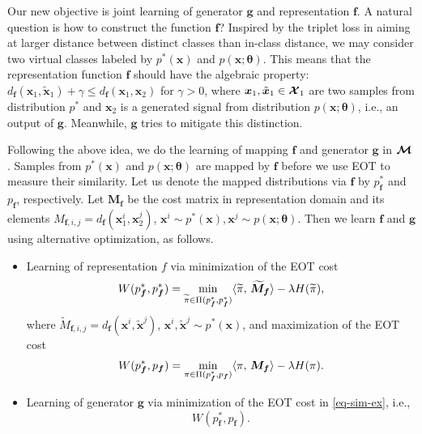 Our new objective is joint learning of generator $\bm{g}$ and representation $\bm{f}$. A natural question is how to construct the function $\bm{f}$? {Inspired by the triplet loss in \cite{7298682} aiming at larger distance between distinct classes than in-class distance, we may consider two virtual classes labeled by $p^{\ast}(\bm{x})$ and $p(\bm{x};\bm{\theta})$.
This means that the representation function $\bm{f}$ should have the algebraic property: $ d_{\bm{f}}(\bm{x}_1, \tilde{\bm{x}}_1) + \gamma \leq d_{\bm{f}}(\bm{x}_1, \bm{x}_2) $ for $\gamma > 0$, where $\bm{x}_1, \tilde{\bm{x}}_1 \in \bm{\mathcal{X}}_1$ are two samples from distribution $p^{\ast}$ and $\bm{x}_2$ is a generated signal from distribution $p(\bm{x};\bm{\theta})$, i.e., an output of $\bm{g}$. Meanwhile, $\bm{g}$ tries to mitigate this distinction.}

Following the above idea, we do the learning of mapping $\bm{f}$ and generator $\bm{g}$ in $\bm{\mathcal{M}}$. Samples from $p^{\ast}(\bm{x})$ and $p(\bm{x}; \bm{\theta})$ are mapped by $\bm{f}$ before we use EOT to measure their similarity.
Let us denote the mapped distributions via $\bm{f}$ by $p^{\ast}_{\bm{f}}$ and $p_{\bm{f}}$, respectively. Let $\bm{M}_{\bm{f}}$ be the cost matrix in representation domain and its elements $M_{\bm{f},{i,j}} = d_{\bm{f}}(\bm{x}^{i}_1, \bm{x}^{j}_2)$, $\bm{x}^{i} \sim p^{\ast}(\bm{x}), \bm{x}^{j}\sim p(\bm{x}; \bm{\theta})$. Then we learn $\bm{f}$ and $\bm{g}$ using alternative optimization, as follows. 
\begin{itemize}
\item Learning of representation $f$ via minimization of the EOT cost
  \begin{equation}\label{eq-sim-in}
    W(p^{\ast}_{\bm{f}},p^{\ast}_{\bm{f}}) = \min_{\widetilde{\pi} \in \Pi(p^{\ast}_{\bm{f}}, p^{\ast}_{\bm{f}}) } \langle \widetilde{\pi},\,\widetilde{\bm{M}}_{\bm{f}}\rangle - \lambda H(\widetilde{\pi}),
  \end{equation}
  where $\widetilde{M}_{\bm{f}, {i,j}} = d_{\bm{f}}(\bm{x}^{i}, \tilde{\bm{x}}^{j})$, $\bm{x}^{i}, \tilde{\bm{x}}^{j} \sim p^{\ast}(\bm{x})$, and maximization of the EOT cost
  \begin{equation}\label{eq-sim-ex}
    W(p^{\ast}_{\bm{f}}, p_{\bm{f}}) = \min_{{\pi} \in \Pi(p^{\ast}_{\bm{f}}, p_{\bm{f}}) } \dotp{{\pi}}{\bm{M_f}} - \la H({\pi}).\vspace{-8pt}
  \end{equation}
\item Learning of generator $\bm{g}$ via minimization of the EOT cost in \eqref{eq-sim-ex}, i.e.,
  \begin{equation}
    W(p^{\ast}_{\bm{f}}, p_{\bm{f}}).
  \end{equation}
\end{itemize} 

